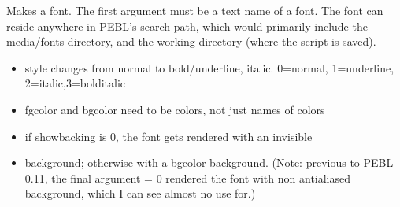 \documentclass[letterpaper,10pt,english]{sphinxmanual}
\begin{document}
\sphinxAtStartPar
Makes a font.  The first argument must be a text   name of a font.  The font can reside anywhere in PEBL’s search path,   which would primarily include the media/fonts directory, and the   working directory (where the script is saved).
\begin{itemize}
\item {} 
\sphinxAtStartPar
style changes from normal to bold/underline, italic. 0=normal, 1=underline, 2=italic,3=bolditalic

\item {} 
\sphinxAtStartPar
fgcolor and bgcolor need to be colors, not just names of colors

\item {} 
\sphinxAtStartPar
if show\sphinxhyphen{}backing is 0, the font gets rendered with an invisible

\item {} 
\sphinxAtStartPar
background; otherwise with a bgcolor background. (Note: previous to PEBL 0.11, the final argument = 0 rendered the font  with non anti\sphinxhyphen{}aliased background, which I can see almost no use for.)

\end{itemize}

\sphinxAtStartPar
{}

\begin{sphinxVerbatim}[commandchars=\\\{\}]
\end{sphinxVerbatim}

\sphinxAtStartPar
{}

\begin{sphinxVerbatim}[commandchars=\\\{\}]
\end{sphinxVerbatim}
\end{document}
